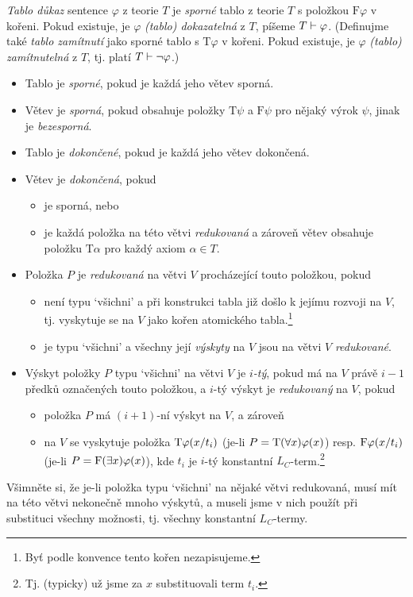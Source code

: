 \begin{definition}
    \emph{Tablo důkaz} sentence $\varphi$ z teorie $T$ je \emph{sporné} tablo z teorie $T$ s položkou $\mathrm{F}\varphi$ v kořeni. Pokud existuje, je $\varphi$ \emph{(tablo) dokazatelná} z $T$, píšeme $T\vdash\varphi$. (Definujme také \emph{tablo zamítnutí} jako sporné tablo s $\mathrm{T}\varphi$ v kořeni. Pokud existuje, je $\varphi$ \emph{(tablo) zamítnutelná} z $T$, tj. platí $T\vdash\neg\varphi$.)  
    \begin{itemize}
        \item Tablo je \emph{sporné}, pokud je každá jeho větev sporná.
        \item Větev je \emph{sporná}, pokud obsahuje položky $\mathrm{T}\psi$ a $\mathrm{F}\psi$ pro nějaký výrok $\psi$, jinak je \emph{bezesporná}.
        \item Tablo je \emph{dokončené}, pokud je každá jeho větev dokončená.
        \item Větev je \emph{dokončená}, pokud 
        \begin{itemize}
            \item je sporná, nebo
            \item je každá položka na této větvi \emph{redukovaná} a zároveň větev obsahuje položku $\mathrm{T}\alpha$ pro každý axiom $\alpha\in T$.
        \end{itemize}
         
        \item Položka $P$ je \emph{redukovaná} na větvi $V$ procházející touto položkou, pokud 
        \begin{itemize}
            \item není typu `všichni' a při konstrukci tabla již došlo k jejímu rozvoji na $V$, tj. vyskytuje se na $V$ jako kořen atomického tabla.\footnote{Byť podle konvence tento kořen nezapisujeme.}
            \item je typu `všichni' a všechny její \emph{výskyty} na $V$ jsou na větvi $V$ \emph{redukované}.
        \end{itemize}
        \item Výskyt položky $P$ typu `všichni' na větvi $V$ je \emph{$i$-tý}, pokud má na $V$ právě $i-1$ předků označených touto položkou, a $i$-tý výskyt je \emph{redukovaný} na $V$, pokud
        \begin{itemize}
            \item položka $P$ má $(i+1)$-ní výskyt na $V$, a zároveň
            \item na $V$ se vyskytuje položka $\mathrm{T}\varphi(x/t_i)$ (je-li $P=\mathrm{T}(\forall x)\varphi(x)$) resp. $\mathrm{F}\varphi(x/t_i)$ (je-li $P=\mathrm{F}(\exists x)\varphi(x)$), kde $t_i$ je $i$-tý konstantní $L_C$-term.\footnote{Tj. (typicky) už jsme za $x$ substituovali term $t_i$.}
        \end{itemize} 
    \end{itemize}
\end{definition}
Všimněte si, že je-li položka typu `všichni' na nějaké větvi redukovaná, musí mít na této větvi nekonečně mnoho výskytů, a museli jsme v nich použít při substituci všechny možnosti, tj. všechny konstantní $L_C$-termy.
    
